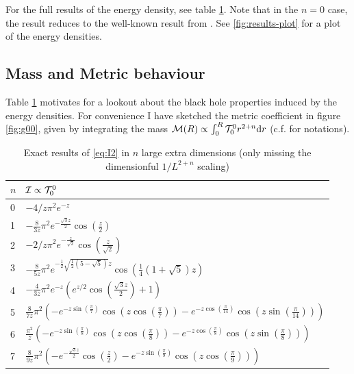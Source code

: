 \documentclass[10pt,a4paper]{article}
\begin{document}
For the full results of the energy density, see table \ref{table:results}. Note that in the $n=0$ case, the result reduces to the well-known result from \cite{isi2013}. See \ref{fig:results-plot} for a plot of the energy densities.

\subsection{Mass and Metric behaviour}
Table \ref{table:results} motivates for a lookout about the black hole properties induced by the energy densities. For convenience I have sketched the metric coefficient in figure \ref{fig:g00},  given by integrating the mass ${\cal M}(R) \propto \int _0^R {\cal T}_0^0 r^{2+n} \mathrm{d} r$ (c.f. \cite{work} for notations).


\begin{table}[b!]
\renewcommand{\arraystretch}{1.7} %
\begin{tabularx}{\textwidth}{ll}
\firsthline
$n$ & ${\cal I} \propto {\cal T}_0^0$ \\
\hline
0 & $-4/z \pi ^2 e^{-z} $ \\
1 & $-\frac{8}{3z} \pi ^2 e^{-\frac{\sqrt{3} z}{2}} \cos \left(\frac{z}{2}\right)$ \\
2 & $-2/z \pi ^2 e^{-\frac{z}{\sqrt{2}}} \cos \left(\frac{z}{\sqrt{2}}\right)$ \\
3 & $-\frac{8}{5z} \pi ^2 e^{-\frac{1}{2} \sqrt{\frac{1}{2} \left(5-\sqrt{5}\right)} z} \cos \left(\frac{1}{4}
   \left(1+\sqrt{5}\right) z\right)$ \\
4 & $-\frac{4}{3z} \pi ^2 e^{-z} \left(e^{z/2} \cos \left(\frac{\sqrt{3} z}{2}\right)+1\right)$ \\
5 & $\frac{8}{7z} \pi ^2 \left(-e^{-z \sin \left(\frac{\pi }{7}\right)} \cos \left(z \cos \left(\frac{\pi
   }{7}\right)\right)-e^{-z \cos \left(\frac{\pi }{14}\right)} \cos \left(z \sin \left(\frac{\pi
   }{14}\right)\right)\right)$ \\
6 & $\frac{\pi ^2}z \left(-e^{-z \sin \left(\frac{\pi }{8}\right)} \cos \left(z \cos \left(\frac{\pi
   }{8}\right)\right)-e^{-z \cos \left(\frac{\pi }{8}\right)} \cos \left(z \sin \left(\frac{\pi
   }{8}\right)\right)\right)$ \\
7 & $\frac{8}{9z} \pi ^2 \left(-e^{-\frac{\sqrt{3} z}{2}} \cos \left(\frac{z}{2}\right)-e^{-z \sin
   \left(\frac{\pi }{9}\right)} \cos \left(z \cos \left(\frac{\pi }{9}\right)\right)\right)$ \\
\hline
\end{tabularx}
\caption{Exact results of \eqref{eq:I2} in $n$ large extra dimensions (only missing the dimensionful $1/L^{2+n}$ scaling)} \label{table:results}
\end{table}
\end{document}
